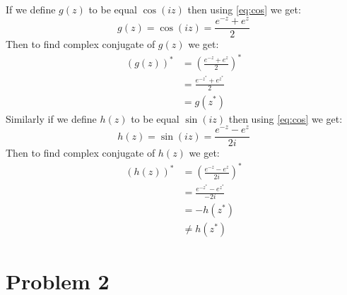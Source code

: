 \documentclass[12pt]{article}
\begin{document}
\subsection{}
If we define $g(z)$ to be equal $\cos(iz)$ then using \ref{eq:cos} we get:
\begin{equation}
        g(z) = \cos(iz) = \frac{e^{-z} + e^z}{2}
\end{equation}
Then to find complex conjugate of $g(z)$ we get:
\begin{equation}
    \begin{split}
        (g(z))^* &= \left(\frac{e^{-z} + e^z}{2}\right)^*\\
        &= \frac{e^{-z^*} + e^{z^*}}{2}\\
        &= g(z^*)
    \end{split}
\end{equation}
Similarly if we define $h(z)$ to be equal $\sin(iz)$ then using \ref{eq:cos} we get:
\begin{equation}
        h(z) = \sin(iz) = \frac{e^{-z} - e^z}{2i}
\end{equation}
Then to find complex conjugate of $h(z)$ we get:
\begin{equation}
    \begin{split}
        (h(z))^* &= \left(\frac{e^{-z} - e^z}{2i}\right)^*\\
        &= \frac{e^{-z^*} - e^{z^*}}{-2i}\\
        &= -h(z^*)\\
        &\neq h(z^*)
    \end{split}
\end{equation}
\section{Problem 2}
\end{document}
